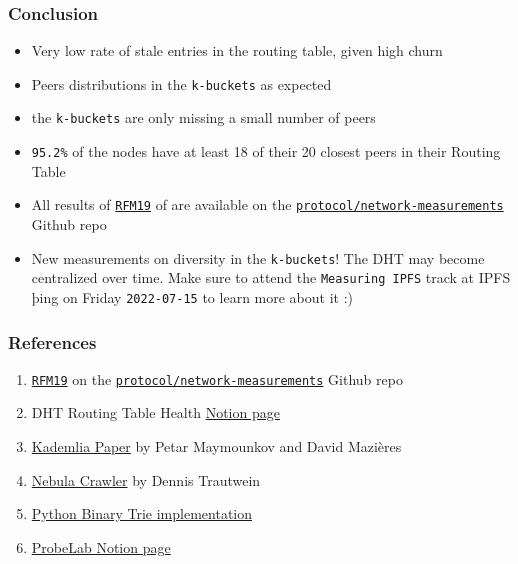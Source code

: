 \documentclass{pl-slide}
\begin{document}
\begin{frame}
\frametitle{Conclusion}
\begin{itemize}
	\item Very low rate of stale entries in the routing table, given high churn
	\item Peers distributions in the \texttt{k-buckets} as expected
	\item the \texttt{k-buckets} are only missing a small number of peers
	\item \texttt{95.2\%} of the nodes have at least 18 of their 20 closest peers in their Routing Table
	\bigskip
	\item All results of \hyperlink{https://github.com/protocol/network-measurements/blob/rfm19/results/rfm19-dht-routing-table-health.md}{\texttt{RFM19}} of are available on the \hyperlink{https://github.com/protocol/network-measurements}{\texttt{protocol/network-measurements}} Github repo
	\item New measurements on diversity in the \texttt{k-buckets}! The DHT may become centralized over time. Make sure to attend the \texttt{Measuring IPFS} track at IPFS þing on Friday \texttt{2022-07-15} to learn more about it :)
\end{itemize}
\end{frame}

\begin{frame}
\frametitle{References}
\begin{enumerate}
	\item \hyperlink{https://github.com/protocol/network-measurements/blob/rfm19/results/rfm19-dht-routing-table-health.md}{\texttt{RFM19}} on the \hyperlink{https://github.com/protocol/network-measurements}{\texttt{protocol/network-measurements}} Github repo
	\item DHT Routing Table Health \hyperlink{https://www.notion.so/pl-strflt/DHT-Routing-Table-Health-f8e6836c4b09440baa909a4448a88fbf}{Notion page}
	\item \hyperlink{https://ipfs.io/ipfs/QmaVrnwZrnoG4YramcN75mbE5AUfCymiEErrHGXoQR968V}{Kademlia Paper} by Petar Maymounkov and David Mazières
	\item \hyperlink{https://github.com/dennis-tra/nebula-crawler}{Nebula Crawler} by Dennis Trautwein
	\item \hyperlink{https://github.com/guillaumemichel/py-binary-trie}{Python Binary Trie implementation}
	\item \hyperlink{https://www.notion.so/pl-strflt/ProbeLab-Protocol-Benchmarking-Optimization-a63238fd1b184d6f8fea4bb38d975208}{ProbeLab Notion page}
\end{enumerate}
\end{frame}
\end{document}
